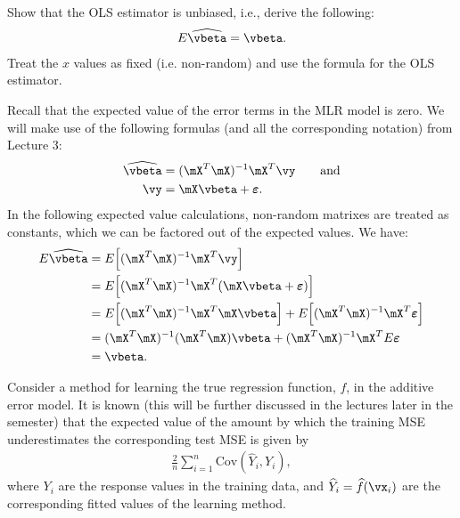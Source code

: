 \documentclass[12pt, answers]{exam}
\def\eps{\varepsilon}
\def\var{\text{Var}}
\def\cov{\text{Cov}}
\def\v{\boldsymbol}
\begin{document}
\begin{questions}


\question


Show that the OLS estimator is unbiased, i.e., derive the following:
\begin{align*}
E\widehat{\vbeta}=\vbeta.
\end{align*}
Treat the $x$ values as fixed (i.e. non-random) and use the formula for the OLS estimator.\vspace{12pt}


\begin{solution}
Recall that the expected value of the error terms in the MLR model is zero.  We will make use of the following formulas (and all the corresponding notation) from Lecture 3:
\begin{align*}
\widehat{\vbeta}&=(\mX^T\mX)^{-1}\mX^T\vy\qquad\text{and}\\
\vy&=\mX\vbeta+\v\eps.
\end{align*}
In the following expected value calculations, non-random matrixes are treated as constants, which we can be factored out of the expected values.  We have:
\begin{align*}
E\widehat{\vbeta}&=E\Big[(\mX^T\mX)^{-1}\mX^T\vy\Big]\\
&=E\Big[(\mX^T\mX)^{-1}\mX^T(\mX\vbeta+\v\eps)\Big]\\
&=E\Big[(\mX^T\mX)^{-1}\mX^T\mX\vbeta\Big]+E\Big[(\mX^T\mX)^{-1}\mX^T\v\eps\Big]\\
&=(\mX^T\mX)^{-1}(\mX^T\mX)\vbeta+(\mX^T\mX)^{-1}\mX^TE\v\eps\\
&=\vbeta.
\end{align*}

\end{solution}



\clearpage
\question



Consider a method for learning the true regression function, $f$, in the additive error model.  It is known (this will be further discussed in the lectures later in the semester) that the expected value of the amount by which the training MSE underestimates the corresponding test MSE is given by
\begin{align}
\label{eq1}
\frac{2}{n}\sum_{i=1}^{n}\cov(\widehat{Y}_i,Y_i),
\end{align}
where $Y_i$ are the response values in the training data, and $\widehat{Y}_i=\widehat{f}(\vx_i)$ are the corresponding fitted values of the learning method.


\end{questions}
\end{document}

